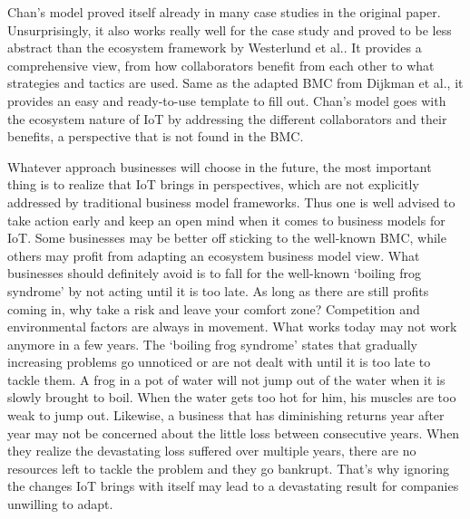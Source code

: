 		Chan's model proved itself already in many case studies in the original paper. Unsurprisingly, it also works really well for the case study and proved to be less abstract than the ecosystem framework by Westerlund et al.. It provides a comprehensive view, from how collaborators benefit from each other to what strategies and tactics are used. Same as the adapted BMC from Dijkman et al., it provides an easy and ready-to-use template to fill out. Chan's model goes with the ecosystem nature of IoT by addressing the different collaborators and their benefits, a perspective that is not found in the BMC.
		
		Whatever approach businesses will choose in the future, the most important thing is to realize that IoT brings in perspectives, which are not explicitly addressed by traditional business model frameworks. Thus one is well advised to take action early and keep an open mind when it comes to business models for IoT. Some businesses may be better off sticking to the well-known BMC, while others may profit from adapting an ecosystem business model view. What businesses should definitely avoid is to fall for the well-known `boiling frog syndrome' by not acting until it is too late. As long as there are still profits coming in, why take a risk and leave your comfort zone? Competition and environmental factors are always in movement. What works today may not work anymore in a few years. The `boiling frog syndrome' states that gradually increasing problems go unnoticed or are not dealt with until it is too late to tackle them. A frog in a pot of water will not jump out of the water when it is slowly brought to boil. When the water gets too hot for him, his muscles are too weak to jump out. Likewise, a business that has diminishing returns year after year may not be concerned about the little loss between consecutive years. When they realize the devastating loss suffered over multiple years, there are no resources left to tackle the problem and they go bankrupt. That's why ignoring the changes IoT brings with itself may lead to a devastating result for companies unwilling to adapt.
	\vspace{-2em}
